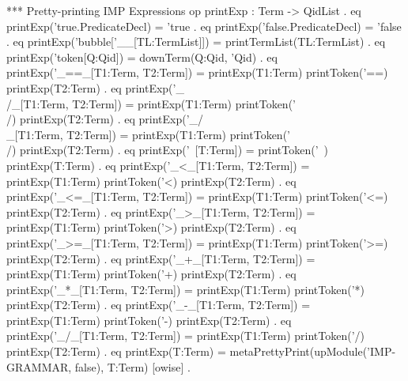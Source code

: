\documentclass[a4paper,openany]{book}
\begin{document}
 *** Pretty-printing IMP Expressions
 op printExp : Term -> QidList .
 eq printExp('true.PredicateDecl) = 'true .
 eq printExp('false.PredicateDecl) = 'false .
 eq printExp('bubble['__[TL:TermList]]) = printTermList(TL:TermList) .
 eq printExp('token[Q:Qid]) = downTerm(Q:Qid, 'Qid) .
 eq printExp('_==_[T1:Term, T2:Term]) =
    printExp(T1:Term) printToken('==) printExp(T2:Term) .
 eq printExp('_\\/_[T1:Term, T2:Term]) =
    printExp(T1:Term) printToken('\\/) printExp(T2:Term) .
 eq printExp('_/\\_[T1:Term, T2:Term]) =
    printExp(T1:Term) printToken('\\/) printExp(T2:Term) .
 eq printExp('~[T:Term]) =
    printToken('~) printExp(T:Term) .
 eq printExp('_<_[T1:Term, T2:Term]) =
    printExp(T1:Term) printToken('<) printExp(T2:Term) .
 eq printExp('_<=_[T1:Term, T2:Term]) =
    printExp(T1:Term) printToken('<=) printExp(T2:Term) .
 eq printExp('_>_[T1:Term, T2:Term]) =
    printExp(T1:Term) printToken('>) printExp(T2:Term) .
 eq printExp('_>=_[T1:Term, T2:Term]) =
    printExp(T1:Term) printToken('>=) printExp(T2:Term) .
 eq printExp('_+_[T1:Term, T2:Term]) =
    printExp(T1:Term) printToken('+) printExp(T2:Term) .
 eq printExp('_*_[T1:Term, T2:Term]) =
    printExp(T1:Term) printToken('*) printExp(T2:Term) .
 eq printExp('_-_[T1:Term, T2:Term]) =
    printExp(T1:Term) printToken('-) printExp(T2:Term) .
 eq printExp('_/_[T1:Term, T2:Term]) =
    printExp(T1:Term) printToken('/) printExp(T2:Term) .
 eq printExp(T:Term) =
    metaPrettyPrint(upModule('IMP-GRAMMAR, false), T:Term) [owise] .
\end{document}
